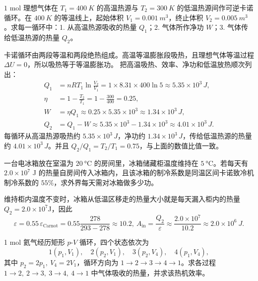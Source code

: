 \documentclass[lang=cn,11pt]{elegantbook}
\begin{document}
\begin{exercise}
\(1\) mol 理想气体在 \(T_1=\SI{400}{K}\) 的高温热源与 \(T_2=\SI{300}{K}\) 的低温热源间作可逆卡诺循环。在 \(\SI{400}{K}\) 的等温线上，起始体积 \(V_1=\SI{0.001}{m^3}\)，终止体积 \(V_2=\SI{0.005}{m^3}\)。求每一循环中：1. 从高温热源吸收的热量 \(Q_1\)；2. 气体所作净功 \(W\)；3. 气体传给低温热源的热量 \(Q_2\)。
\end{exercise}

\begin{solution}
卡诺循环由两段等温和两段绝热组成。高温等温膨胀段吸热，且理想气体等温过程 \(\Delta U=0\)，所以吸热等于等温膨胀功。
把高温吸热、效率、净功和低温放热顺次列出：
\[
\begin{aligned}
Q_1&=nRT_1\ln\frac{V_2}{V_1}
=1\times8.31\times400\ln5
\approx 5.35\times10^3\,\si{J},\\
\eta&=1-\frac{T_2}{T_1}
=1-\frac{300}{400}
=0.25,\\
W&=\eta Q_1
\approx0.25\times5.35\times10^3
\approx1.34\times10^3\,\si{J},\\
Q_2&=Q_1-W
\approx 5.35\times10^3-1.34\times10^3
\approx4.01\times10^3\,\si{J}.
\end{aligned}
\]
每循环从高温热源吸热约 \(5.35\times10^3\,\si{J}\)，净功约 \(1.34\times10^3\,\si{J}\)，传给低温热源的热量约 \(4.01\times10^3\,\si{J}\)。并且 \(Q_2/Q_1=T_2/T_1=0.75\)，与上面的数值比值一致。
\end{solution}


\begin{exercise}[电冰箱的输入功怎样由致冷系数反推]
一台电冰箱放在室温为 \(\SI{20}{\celsius}\) 的房间里，冰箱储藏柜温度维持在 \(\SI{5}{\celsius}\)。若每天有 \(2.0\times10^7\) J 的热量自房间传入冰箱内，且该冰箱的制冷系数是同温区间卡诺致冷机制冷系数的 \(55\%\)，求外界每天需对冰箱做多少功。
\end{exercise}

\begin{solution}
维持柜内温度不变时，冰箱从低温区移走的热量大小就是每天漏入柜内的热量$Q_2=2.0\times10^7$J，因此
 \[\varepsilon=0.55\,\varepsilon_{\text{Carnot}}=0.55\frac{278}{293-278}\approx 10.2,~A_{\text{in}}=\frac{Q_2}{\varepsilon} \approx \frac{2.0\times10^7}{10.2} \approx 2.0\times10^6\ \si{J}.\]
\end{solution}

\begin{exercise}
1 mol 氦气经历矩形 \(p\)-\(V\) 循环，四个状态依次为
\[
1(p_1,V_1),\quad 2(p_2,V_1),\quad 3(p_2,V_4),\quad 4(p_1,V_4),
\]
其中 \(p_2=2p_1,\ V_4=2V_1\)，循环方向为 \(1\to2\to3\to4\to1\)。求各过程 \(1\to2,\ 2\to3,\ 3\to4,\ 4\to1\) 中气体吸收的热量，并求该热机效率。
\end{exercise}
\end{document}
